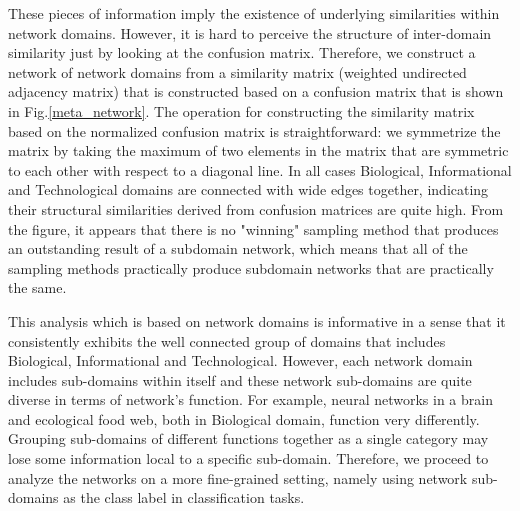 \documentclass{article}
\begin{document}
These pieces of information imply the existence of underlying similarities within network domains. However, it is hard to perceive the structure of inter-domain similarity just by looking at the confusion matrix. Therefore, we construct a network of network domains from a similarity matrix (weighted undirected adjacency matrix) that is constructed based on a confusion matrix that is shown in Fig.\ref{meta_network}. The operation for constructing the similarity matrix based on the normalized confusion matrix is straightforward: we symmetrize the matrix by taking the maximum of two elements in the matrix that are symmetric to each other with respect to a diagonal line. In all cases Biological, Informational and Technological domains are connected with wide edges together, indicating their structural similarities derived from confusion matrices are quite high. From the figure, it appears that there is no "winning" sampling method that produces an outstanding result of a subdomain network, which means that all of the sampling methods practically produce subdomain networks that are practically the same.


This analysis which is based on network domains is informative in a sense that it consistently exhibits the well connected group of domains that includes Biological, Informational and Technological. However, each network domain includes sub-domains within itself and these network sub-domains are quite diverse in terms of network's function. For example, neural networks in a brain and ecological food web, both in Biological domain, function very differently. Grouping sub-domains of different functions together as a single category may lose some information local to a specific sub-domain. Therefore, we proceed to analyze the networks on a more fine-grained setting, namely using network sub-domains as the class label in classification tasks.
 
\end{document}
